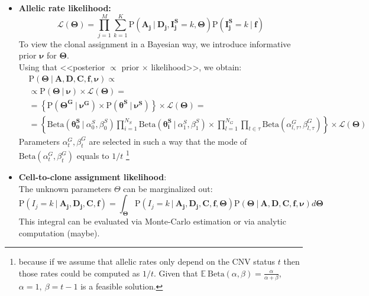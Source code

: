 \documentclass[11pt,a4paper,fullpage]{article}
\def\E{\mathbb{E}}
\def\P{\mathrm{P}}
\theoremstyle{definition}
\theoremstyle{definition}
\theoremstyle{definition}
\numberwithin{equation}{section}
\begin{document}
\begin{itemize}
		\item \textbf{Allelic rate likelihood:} 
		\begin{equation}
		\mathcal{L}(\mathbf{\Theta}) = \prod_{j=1}^{M} \sum_{k=1}^{K} \P(\mathbf{A_{j}}\ |\ \mathbf{D_{j}}, \mathbf{I^{S}_{j}} = k, \mathbf{\Theta})\P(\mathbf{I^{S}_{j}} = k\ |\ \mathbf{f}) 
		\end{equation}
		To view the clonal assignment in a Bayesian way, we introduce informative prior $ \mathbf{\nu} $ for $\mathbf{\Theta}$.\\ 
		Using that <<posterior $ \propto $ prior $\times$ likelihood>>, we obtain:
		\begin{equation}
		\begin{aligned}
		&\P(\mathbf{\Theta}\ |\ \mathbf{A}, \mathbf{D}, \mathbf{C}, \mathbf{f}, \mathbf{\nu}) \propto\\
		&\propto \P(\mathbf{\Theta}\ |\ \mathbf{\nu}) \times \mathcal{L}(\mathbf{\Theta}) =\\
		&= \left\{\P(\mathbf{\Theta^{G}}\ |\ \mathbf{\nu^{G}}) \times \P(\mathbf{\theta^{S}}\ |\ \mathbf{\nu^{S}})\right\} \times \mathcal{L}(\mathbf{\Theta}) =\\ 
		&= \left\{\mathrm{Beta}(\mathbf{\theta^{S}_{0}}\ |\ \alpha^{S}_0, \beta^{S}_0) \prod_{i=1}^{N_{S}} \mathrm{Beta}(\mathbf{\theta^{S}_{i}}\ |\ \alpha^{S}_1, \beta^{S}_1) \times \prod_{l=1}^{N_{G}} \prod_{t\in\tau} \mathrm{Beta}(\alpha_{l,\tau}^{G}, \beta_{l,\tau}^{G}) \right\} \times \mathcal{L}(\mathbf{\Theta})
		\end{aligned}
		\end{equation}
		Parameters $\alpha^{G}_{t}, \beta^{G}_{t}$ are selected in such a way that the mode of $\mathrm{Beta}(\alpha^{G}_{t}, \beta^{G}_{t})$ equals to $ 1 / t $ \footnote{because if we assume that allelic rates only depend on the CNV status $ t $ then those rates could be computed as $ 1 / t $. Given that $ \E\  \mathrm{Beta}(\alpha, \beta) = \frac{\alpha}{\alpha + \beta} $, $\alpha = 1,\ \beta = t - 1$ is a feasible solution.}
		
		\item \textbf{Cell-to-clone assignment likelihood}:\\
		The unknown parameters $\Theta$ can be marginalized out:
		\begin{equation}
		\P(I_{j} = k\ |\ \mathbf{A_{j}}, \mathbf{D_{j}}, \mathbf{C}, \mathbf{f}) = \int_{\mathbf{\Theta}} \P(I_{j} = k\ |\ \mathbf{A_{j}}, \mathbf{D_{j}}, \mathbf{C}, \mathbf{f}, \mathbf{\Theta}) \P(\mathbf{\Theta}\ |\ \mathbf{A}, \mathbf{D}, \mathbf{C}, \mathbf{f}, \mathbf{\nu})d\mathbf{\Theta}
		\end{equation}
		This integral can be evaluated via Monte-Carlo estimation or via analytic computation (maybe).
	\end{itemize}
	
\end{document}
